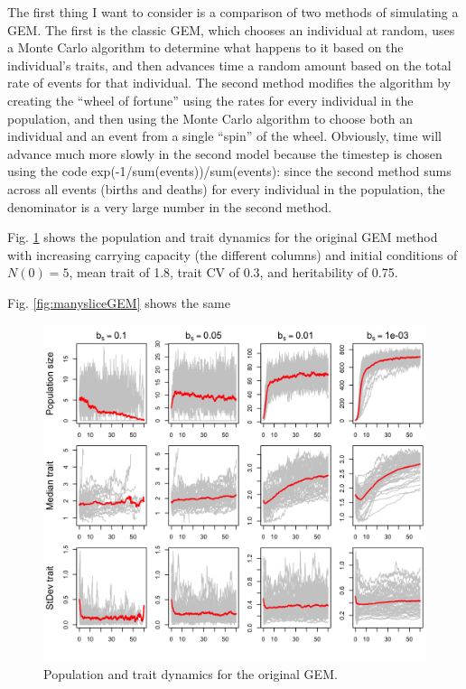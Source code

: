 \documentclass[12pt,reqno,final,pdftex]{amsart}\usepackage[]{graphicx}\usepackage[]{color}
\newenvironment{knitrout}{}{} %
\theoremstyle{plain}
\numberwithin{equation}{part}
\begin{document}
The first thing I want to consider is a comparison of two methods of simulating a GEM.
The first is the classic GEM, which chooses an individual at random, uses a Monte Carlo algorithm to determine what happens to it based on the individual's traits, and then advances time a random amount based on the total rate of events for that individual.
The second method modifies the algorithm by creating the ``wheel of fortune'' using the rates for every individual in the population, and then using the Monte Carlo algorithm to choose both an individual and an event from a single ``spin'' of the wheel.
Obviously, time will advance much more slowly in the second model because the timestep is chosen using the code exp(-1/sum(events))/sum(events): since the second method sums across all events (births and deaths) for every individual in the population, the denominator is a very large number in the second method.

Fig. \ref{fig:originalGEM} shows the population and trait dynamics for the original GEM method with increasing carrying capacity (the different columns) and initial conditions of $N(0) = 5$, mean trait of 1.8, trait CV of 0.3, and heritability of 0.75.

Fig. \ref{fig:manysliceGEM} shows the same

\begin{knitrout}\scriptsize
{}\color{fgcolor}\begin{figure}

\includegraphics[width=\linewidth]{figure/originalGEM-1} \hfill{}

\caption[Population and trait dynamics for the original GEM]{Population and trait dynamics for the original GEM.}\label{fig:originalGEM}
\end{figure}


\end{knitrout}
\end{document}
